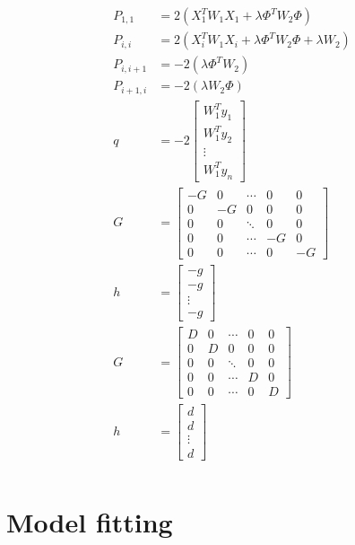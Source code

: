 \documentclass{article}
\theoremstyle{plain}
\theoremstyle{definition}
\theoremstyle{remark}
\begin{document}
\begin{equation}
\begin{split}
P_{1,1} &= 2(X_1^T W_1 X_1 + \lambda \Phi^T W_2 \Phi)\\
P_{i,i} &= 2(X_i^T W_1 X_i + \lambda \Phi^T W_2 \Phi + \lambda W_2)\\
P_{i, i+1} &= -2( \lambda \Phi^T W_2)\\
P_{i+1, i} &= - 2(\lambda W_2 \Phi)\\
q &= 
-2\left[
\begin{array}{c}
W_1^T y_1\\
W_1^T y_2\\
\vdots\\
W_1^T y_n
\end{array}
\right]\\
G &= \left[
\begin{array}{ccccc}
-G&0&\cdots&0&0\\
0&-G&0&0&0\\
0&0&\ddots&0&0\\
0&0&\cdots&-G&0\\
0&0&\cdots&0&-G
\end{array}
\right]\\
h &= 
\left[
\begin{array}{c}
-g\\
-g\\
\vdots\\
-g
\end{array}
\right]\\
G &= \left[
\begin{array}{ccccc}
D&0&\cdots&0&0\\
0&D&0&0&0\\
0&0&\ddots&0&0\\
0&0&\cdots&D&0\\
0&0&\cdots&0&D
\end{array}
\right]\\
h &= 
\left[
\begin{array}{c}
d\\
d\\
\vdots\\
d
\end{array}
\right]\\
\end{split}
\end{equation}


\section{Model fitting}
\end{document}

